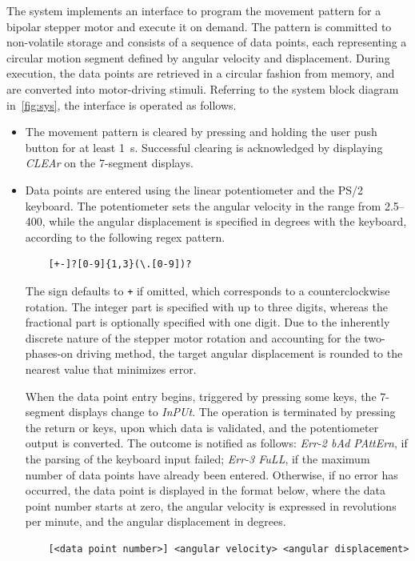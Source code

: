 \documentclass[]{article}
\begin{document}
The system implements an interface to program the movement pattern for a bipolar stepper motor and execute it on demand. The pattern is committed to non-volatile storage and consists of a sequence of data points, each representing a circular motion segment defined by angular velocity and displacement. During execution, the data points are retrieved in a circular fashion from memory, and are converted into motor-driving stimuli.
Referring to the system block diagram in~\cref{fig:sys}, the interface is operated as follows.
\begin{itemize}
    \item The movement pattern is cleared by pressing and holding the user push button for at least \qty{1}{\s}. Successful clearing is acknowledged by displaying \emph{CLEAr} on the 7-segment displays.
    
    \item Data points are entered using the linear potentiometer and the PS/2 keyboard. The potentiometer sets the angular velocity in the range from \qtyrange{2.5}{400}{\rpm}, while the angular displacement is specified in degrees with the keyboard, according to the following regex pattern.
    \begin{center}
    \begin{BVerbatim}
    [+-]?[0-9]{1,3}(\.[0-9])?
    \end{BVerbatim}
    \end{center}
    The sign defaults to \verb|+| if omitted, which corresponds to a counterclockwise rotation. The integer part is specified with up to three digits, whereas the fractional part is optionally specified with one digit.
    Due to the inherently discrete nature of the stepper motor rotation and accounting for the two-phases-on driving method, the target angular displacement is rounded to the nearest value that minimizes error.

    When the data point entry begins, triggered by pressing some keys, the 7-segment displays change to \emph{InPUt}. The operation is terminated by pressing the return \keys{\return} or \keys{\enter} keys, upon which data is validated, and the potentiometer output is converted. The outcome is notified as follows: \emph{Err-2 bAd PAttErn}, if the parsing of the keyboard input failed; \emph{Err-3 FuLL}, if the maximum number of data points have already been entered. Otherwise, if no error has occurred, the data point is displayed in the format below, where the data point number starts at zero, the angular velocity is expressed in revolutions per minute, and the angular displacement in degrees.
    \begin{center}
    \begin{BVerbatim}
    [<data point number>] <angular velocity> <angular displacement>
    \end{BVerbatim}
    \end{center}


\end{itemize}
\end{document}
